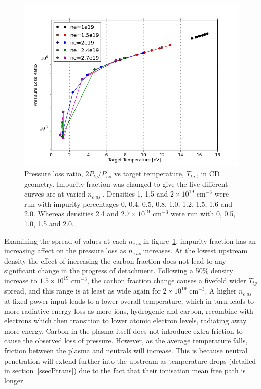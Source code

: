 \documentclass[12pt]{article}  %
\providecommand{\noNe}[1]{{${#1}\times 10^{19}$ cm$^{-3}$}} %
\providecommand{\neus}{$n_{e~us}~$} %
\providecommand{\Ttg}{$T_{tg}~$} %
\begin{document}
\begin{figure}
\includegraphics[scale=0.6]{Figures/sol1d/CvarPL5nes.png}
\centering
\caption{Pressure loss ratio, $2P_{tg}/P_{us}$ vs target temperature, \Ttg, in CD geometry. Impurity fraction was changed to give the five different curves are at varied \neus. Densities 1, 1.5 and \noNe{2} were run with impurity percentages 0, 0.4, 0.5, 0.8, 1.0, 1.2, 1.5, 1.6 and 2.0. Whereas densities 2.4 and \noNe{2.7} were run with 0, 0.5, 1.0, 1.5 and 2.0.}\label{figCvarPL5nes}
\end{figure}

Examining the spread of values at each \neus in figure~\ref{figCvarPL5nes}, impurity fraction has an increasing affect on the pressure loss as \neus increases. At the lowest upstream density the effect of increasing the carbon fraction does not lead to any significant change in the progress of detachment. Following a 50\% density increase to \noNe{1.5}, the carbon fraction change causes a fivefold wider \Ttg spread, and this range is at least as wide again for \noNe{2}. A higher \neus at fixed power input leads to a lower overall temperature, which in turn leads to more radiative energy loss as more ions, hydrogenic and carbon, recombine with electrons which then transition to lower atomic electron levels, radiating away more energy. Carbon in the plasma itself does not introduce extra friction to cause the observed loss of pressure. However, as the average temperature falls, friction between the plasma and neutrals will increase. This is because neutral penetration will extend further into the upstream as temperature drops (detailed in section~\ref{ssecPtrans}) due to the fact that their ionisation mean free path is longer.
\end{document}

